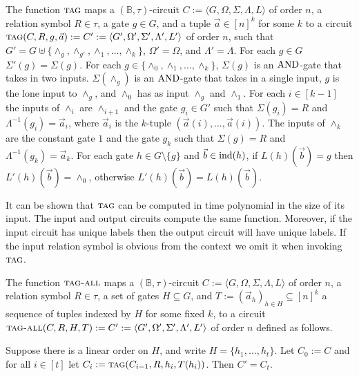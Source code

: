 \documentclass[../paper.tex]{subfiles}
\begin{document}
\begin{definition}
  The function ${\normalfont\textsc{tag}}$ maps a $(\mathbb{B}, \tau)$-circuit $C := \langle G,
  \Omega, \Sigma, \Lambda, L \rangle$ of order $n$, a relation symbol $R \in
  \tau$, a gate $g \in G$, and a tuple $\vec{a} \in [n]^k$ for some $k$ to a
  circuit ${\normalfont\textsc{tag}}(C, R, g, \vec{a}) := C' := \langle G', \Omega', \Sigma',
  \Lambda', L'\rangle$ of order $n$, such that $G' = G \uplus \{\land_g,
  \land_{g'}, \land_1, \ldots , \land_k\}$, $\Omega' = \Omega$, and $\Lambda' =
  \Lambda$. For each $g \in G$ $\Sigma'(g) = \Sigma(g)$. For each $g \in
  \{\land_0, \land_1, \ldots , \land_k \}$, $\Sigma(g)$ is an $\text{\upshape AND}$-gate that
  takes in two inputs. $\Sigma(\land_g)$ is an $\text{\upshape AND}$-gate that takes in a
  single input, $g$ is the lone input to $\land_g$, and $\land_0$ has as input
  $\land_g$ and $\land_1$. For each $i \in [k-1]$ the inputs of $\land_i$ are
  $\land_{i+1}$ and the gate $g_i \in G'$ such that $\Sigma(g_i) = R$ and
  $\Lambda^{-1}(g_i) = \vec{a}_i$, where $\vec{a}_i$ is the $k$-tuple
  $(\vec{a}(i), \ldots, \vec{a}(i))$. The inputs of $\land_k$ are the constant
  gate $1$ and the gate $g_k$ such that $\Sigma(g) = R$ and $\Lambda^{-1}(g_k) =
  \vec{a}_k$. For each gate $h \in G \setminus \{g\}$ and $\vec{b} \in \text{\upshape ind}(h)$,
  if $L(h)(\vec{b}) = g$ then $L'(h)(\vec{b}) = \land_0$, otherwise
  $L'(h)(\vec{b}) = L(h)(\vec{b})$.
\end{definition}

It can be shown that ${\normalfont\textsc{tag}}$ can be computed in time polynomial in the size
of its input. The input and output circuits compute the same function. Moreover,
if the input circuit has unique labels then the output circuit will have unique
labels. If the input relation symbol is obvious from the context we omit it when
invoking ${\normalfont\textsc{tag}}$.

\begin{definition}
  The function ${\normalfont\textsc{tag-all}}$ maps a $(\mathbb{B}, \tau)$-circuit $C := \langle
  G, \Omega, \Sigma, \Lambda, L \rangle$ of order $n$, a relation symbol $R \in
  \tau$, a set of gates $H \subseteq G$, and $T := (\vec{a}_h)_{h \in H}
  \subseteq [n]^{k}$ a sequence of tuples indexed by $H$ for some fixed $k$, to
  a circuit ${\normalfont\textsc{tag-all}}(C, R, H, T) := C' := \langle G', \Omega', \Sigma',
  \Lambda', L'\rangle$ of order $n$ defined as follows.

  Suppose there is a linear order on $H$, and write $H = \{h_1, \ldots, h_t\}$.
  Let $C_0 := C$ and for all $i \in [t]$ let $C_i := {\normalfont\textsc{tag}}(C_{i-1}, R, h_i,
  T(h_i))$. Then $C' = C_{t}$.
\end{definition}
\end{document}
